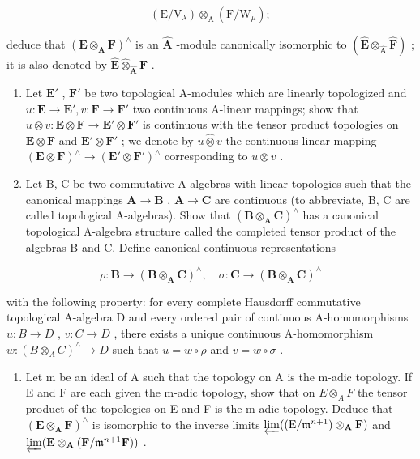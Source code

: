 \[
\left(\mathrm{E} / \mathrm{V} _ {\lambda}\right) \otimes_ {\mathrm{A}} \left(\mathrm{F} / \mathrm{W} _ {\mu}\right);
\]

deduce that \((\mathbf{E} \otimes_{\mathbf{A}} \mathbf{F})^{\wedge}\) is an \(\hat{\mathbf{A}}\) -module canonically isomorphic to \((\hat{\mathbf{E}} \otimes_{\hat{\mathbf{A}}} \hat{\mathbf{F}})\) ; it is also denoted by \(\hat{\mathbf{E}} \widehat{\otimes}_{\hat{\mathbf{A}}} \hat{\mathbf{F}}\) .

\begin{enumerate}
\def\labelenumi{(\alph{enumi})}
\setcounter{enumi}{1}
\item
  Let \(\mathbf{E}'\) , \(\mathbf{F}'\) be two topological A-modules which are linearly topologized and \(u: \mathbf{E} \to \mathbf{E}', v: \mathbf{F} \to \mathbf{F}'\) two continuous A-linear mappings; show that \(u \otimes v: \mathbf{E} \otimes \mathbf{F} \to \mathbf{E}' \otimes \mathbf{F}'\) is continuous with the tensor product topologies on \(\mathbf{E} \otimes \mathbf{F}\) and \(\mathbf{E}' \otimes \mathbf{F}'\) ; we denote by \(u \hat{\otimes} v\) the continuous linear mapping \((\mathbf{E} \otimes \mathbf{F})^{\wedge} \to (\mathbf{E}' \otimes \mathbf{F}')^{\wedge}\) corresponding to \(u \otimes v\) .
\item
  Let B, C be two commutative A-algebras with linear topologies such that the canonical mappings \(\mathbf{A} \to \mathbf{B}\) , \(\mathbf{A} \to \mathbf{C}\) are continuous (to abbreviate, B, C are called topological A-algebras). Show that \((\mathbf{B} \otimes_{\mathbf{A}} \mathbf{C})^{\wedge}\) has a canonical topological A-algebra structure called the completed tensor product of the algebras B and C. Define canonical continuous representations
\end{enumerate}

\[
\rho \colon \mathbf {B} \rightarrow (\mathbf {B} \otimes_ {\mathbf {A}} \mathbf {C}) ^ {\wedge}, \quad \sigma \colon \mathbf {C} \rightarrow (\mathbf {B} \otimes_ {\mathbf {A}} \mathbf {C}) ^ {\wedge}
\]

with the following property: for every complete Hausdorff commutative topological A-algebra D and every ordered pair of continuous A-homomorphisms \(u\colon B\to D\) , \(v\colon C\to D\) , there exists a unique continuous A-homomorphism \(w\colon(B\otimes_{A}C)^{\wedge}\to D\) such that \(u=w\circ\rho\) and \(v=w\circ\sigma\) .

\begin{enumerate}
\def\labelenumi{(\alph{enumi})}
\setcounter{enumi}{3}
\tightlist
\item
  Let m be an ideal of A such that the topology on A is the m-adic topology. If E and F are each given the m-adic topology, show that on \(E \otimes_{A} F\) the tensor product of the topologies on E and F is the m-adic topology. Deduce that \((\mathbf{E} \otimes_{\mathbf{A}} \mathbf{F})^{\wedge}\) is isomorphic to the inverse limits \(\varprojlim ((\mathrm{E} / \mathfrak{m}^{n+1}) \otimes_{\mathbf{A}} \mathbf{F})\) and \(\varprojlim (\mathbf{E} \otimes_{\mathbf{A}} (\mathbf{F} / \mathfrak{m}^{n+1}\mathbf{F}))\) .
\end{enumerate}

